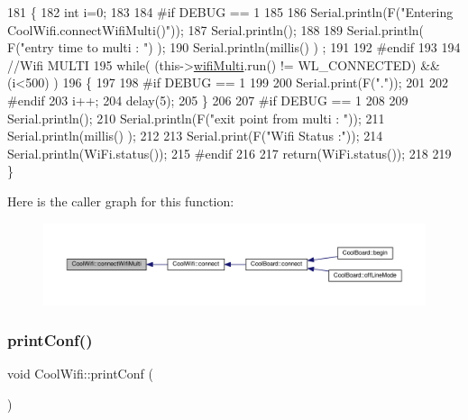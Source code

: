\begin{DoxyCode}
181 \{
182     \textcolor{keywordtype}{int} i=0;
183 
184 \textcolor{preprocessor}{#if DEBUG == 1 }
185 
186     Serial.println(F(\textcolor{stringliteral}{"Entering CoolWifi.connectWifiMulti()"}));
187     Serial.println();
188     
189     Serial.println( F(\textcolor{stringliteral}{"entry time to multi : "}) );
190     Serial.println(millis() ) ;
191 
192 \textcolor{preprocessor}{#endif}
193     
194     \textcolor{comment}{//Wifi MULTI}
195     \textcolor{keywordflow}{while}( (this->\hyperlink{class_cool_wifi_a7862a8c0d7239877e2956c14a368aab8}{wifiMulti}.run() != WL\_CONNECTED) && (i<500)  ) 
196     \{
197 
198 \textcolor{preprocessor}{    #if DEBUG == 1}
199 
200         Serial.print(F(\textcolor{stringliteral}{"."}));
201         
202 \textcolor{preprocessor}{    #endif}
203         i++;
204         delay(5);
205         \}   
206 
207 \textcolor{preprocessor}{#if DEBUG == 1 }
208 
209     Serial.println();   
210     Serial.println(F(\textcolor{stringliteral}{"exit point from multi : "}));
211     Serial.println(millis() );
212     
213     Serial.print(F(\textcolor{stringliteral}{"Wifi Status :"}));
214     Serial.println(WiFi.status());
215 \textcolor{preprocessor}{#endif}
216 
217     \textcolor{keywordflow}{return}(WiFi.status());
218 
219 \}
\end{DoxyCode}
Here is the caller graph for this function\+:\nopagebreak
\begin{figure}[H]
\begin{center}
\leavevmode
\includegraphics[width=350pt]{d7/d29/class_cool_wifi_a419de92d738f14b7444cf822b3ab0070_icgraph}
\end{center}
\end{figure}
\mbox{\label{class_cool_wifi_a9e6105c6d13d35ec510f6633da9e0223}} 
\subsubsection{\texorpdfstring{print\+Conf()}{printConf()}}
{\footnotesize\ttfamily void Cool\+Wifi\+::print\+Conf (\begin{DoxyParamCaption}{ }\end{DoxyParamCaption})}

